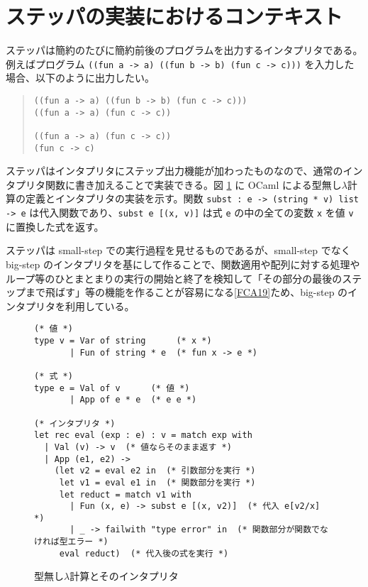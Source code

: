 \section{ステッパの実装におけるコンテキスト}
\label{section:context}

ステッパは簡約のたびに簡約前後のプログラムを出力するインタプリタである。例えばプログラム \texttt{((fun a -> a) ((fun b -> b) (fun c -> c)))} を入力した場合、以下のように出力したい。

\begin{quote}
\begin{verbatim}
((fun a -> a) ((fun b -> b) (fun c -> c)))
((fun a -> a) (fun c -> c))

((fun a -> a) (fun c -> c))
(fun c -> c)
\end{verbatim}
\end{quote}

ステッパはインタプリタにステップ出力機能が加わったものなので、通常のインタプリタ関数に書き加えることで実装できる。図 \ref{figure:lambda} に OCaml による型無し$\lambda$計算の定義とインタプリタの実装を示す。関数 \texttt{subst : e -> (string * v) list -> e} は代入関数であり、\texttt{subst e [(x, v)]} は式 \texttt{e} の中の全ての変数 \texttt{x} を値 \texttt{v} に置換した式を返す。

ステッパは small-step での実行過程を見せるものであるが、small-step でなく big-step のインタプリタを基にして作ることで、関数適用や配列に対する処理やループ等のひとまとまりの実行の開始と終了を検知して「その部分の最後のステップまで飛ばす」等の機能を作ることが容易になる\ref{FCA19}ため、big-step のインタプリタを利用している。

\begin{figure}
\begin{verbatim}
(* 値 *)
type v = Var of string      (* x *)
       | Fun of string * e  (* fun x -> e *)

(* 式 *)
type e = Val of v      (* 値 *)
       | App of e * e  (* e e *)

(* インタプリタ *)
let rec eval (exp : e) : v = match exp with
  | Val (v) -> v  (* 値ならそのまま返す *)
  | App (e1, e2) ->
    (let v2 = eval e2 in  (* 引数部分を実行 *)
     let v1 = eval e1 in  (* 関数部分を実行 *)
     let reduct = match v1 with
       | Fun (x, e) -> subst e [(x, v2)]  (* 代入 e[v2/x] *)
       | _ -> failwith "type error" in  (* 関数部分が関数でなければ型エラー *)
     eval reduct)  (* 代入後の式を実行 *)
\end{verbatim}
\caption{型無し$\lambda$計算とそのインタプリタ}
\label{figure:lambda}
\end{figure}

